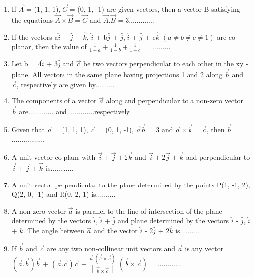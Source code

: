 \begin{enumerate}[label=\arabic*.,ref=\thesubsection.\theenumi]
\item If $\overrightarrow{A}$ = (1, 1, 1), $\overrightarrow{C}$ = (0, 1, -1) are given vectors, then a vector B satisfying the equations $\overrightarrow{A} \times \overrightarrow{B} = \overrightarrow{C}$ and 
$\overrightarrow{A} . \overrightarrow{B}$ = 3.............

\item If the vectors a$\hat{i}$ + $\hat{j}$ + $\hat{k}$, $\hat{i}$ + b$\hat{j}$ + $\hat{j}$, $\hat{i}$ + $\hat{j}$ + c$\hat{k}$ $(a \neq b \neq c \neq 1)$ are co-planar, then the value of 
$\frac{1}{1 - a} + \frac{1}{1 - b} + \frac{1}{1 - c}$ = ..........

\item Let b = 4$\hat{i}$ + 3$\hat{j}$ and $\overrightarrow{c}$ be two vectors perpendicular to each other in the xy - plane. All vectors in the same plane having projections 1 and 2 along $\overrightarrow{b}$ and $\overrightarrow{c}$, respectively are given by..........

\item The components of a vector $\overrightarrow{a}$ along and perpendicular to a non-zero vector 
$\overrightarrow{b}$ are............. and .............respectively.

\item Given that $\overrightarrow{a}$ = (1, 1, 1), $\overrightarrow{c}$ = (0, 1, -1), $\overrightarrow{a}\overrightarrow{b}$ = 3 and $\overrightarrow{a} \times \overrightarrow{b} = \overrightarrow{c}$, then $\overrightarrow{b}$ = .................

\item A unit vector co-planr with $\overrightarrow{i} + \overrightarrow{j} + 2\overrightarrow{k}$ and 
$\overrightarrow{i} + 2\overrightarrow{j} + \overrightarrow{k}$ and perpendicular to $\overrightarrow{i} + \overrightarrow{j} + \overrightarrow{k}$ is............

\item A unit vector perpendicular to the plane determined by the points P(1, -1, 2), Q(2, 0, -1) and R(0, 2, 1) is..........

\item A non-zero vector $\overrightarrow{a}$ is parallel to the line of intersection of the plane determined by the vectors $\hat{i}$, $\hat{i}$ + $\hat{j}$ and plane determined by the vectors $\hat{i}$ - $\hat{j}$, 
$\hat{i}$ + $\hat{k}$. The angle between $\overrightarrow{a}$ and the vector $\hat{i}$ - 2$\hat{j}$ + 2$\hat{k}$ is...........

\item If $\overrightarrow{b}$ and $\overrightarrow{c}$ are any two non-collinear unit vectors and $\overrightarrow{a}$ is any vector $(\overrightarrow{a} . \overrightarrow{b})\overrightarrow{b}$ + $(\overrightarrow{a} . \overrightarrow{c})\overrightarrow{c}$ + $\frac{\overrightarrow{a} . (\overrightarrow{b} \times \overrightarrow{c})}{\begin{vmatrix} \overrightarrow{b} \times \overrightarrow{c} \end{vmatrix}}$ 
$(\overrightarrow{b} \times \overrightarrow{c})$ = ..............


\end{enumerate}
